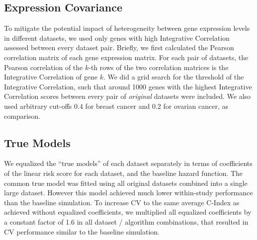 \documentclass{bioinfo}
\begin{document}
  \subsection{Expression Covariance}
  To mitigate the potential impact of heterogeneity between gene
  expression levels in different datasets, we used only genes with
  high Integrative Correlation \citep{Parmigiani2004, Garrett-Mayer2008} assessed
  between every dataset pair. Briefly, we first calculated the Pearson
  correlation matrix of each gene expression matrix. For each pair of
  datasets, the Pearson correlation of the $k$-th rows of the two
  correlation matrices is the Integrative Correlation of gene $k$. 
  We did a grid search for the threshold of the Integrative Correlation,
  such that around 1000 genes with
  the highest Integrative Correlation scores between every pair
  of \emph{original} datasets were included. We also used arbitrary cut-offs 0.4 for 
  breast cancer and 0.2 for ovarian cancer, as comparison.

  \subsection{True Models}
  We equalized the ``true models'' of each dataset separately in terms
  of coefficients of the linear risk score for each dataset, and
  the baseline hazard function.  The common true model was fitted using
  all original datasets combined into a single large dataset.  However
  this model achieved much lower within-study performance than the
  baseline simulation. To increase CV to the same average C-Index as achieved without
  equalized coefficients, we multiplied all equalized coefficients
  by a constant factor of 1.6 in all dataset / algorithm combinations, that resulted 
  in CV performance similar
  to the baseline simulation.%


  
\end{document}
